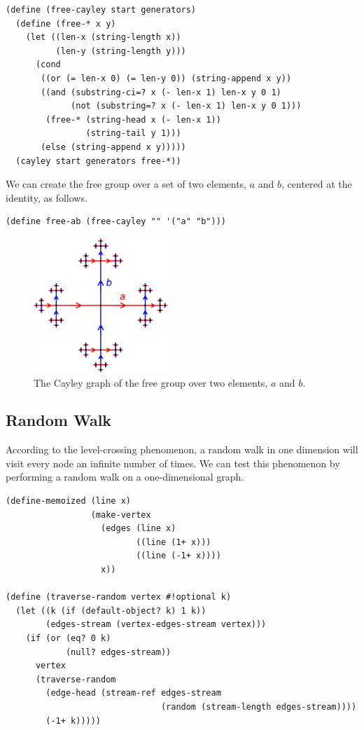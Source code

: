 \documentclass[11pt]{article} %
\theoremstyle{component}
\begin{document}
\begin{verbatim}
(define (free-cayley start generators)
  (define (free-* x y)
    (let ((len-x (string-length x))
          (len-y (string-length y)))
      (cond
       ((or (= len-x 0) (= len-y 0)) (string-append x y))
       ((and (substring-ci=? x (- len-x 1) len-x y 0 1)
             (not (substring=? x (- len-x 1) len-x y 0 1)))
        (free-* (string-head x (- len-x 1))
                (string-tail y 1)))
       (else (string-append x y)))))
  (cayley start generators free-*))
\end{verbatim}

\noindent We can create the free group over a set of two elements, $a$ and $b$, centered at the identity, as follows.

\begin{verbatim}
(define free-ab (free-cayley "" '("a" "b")))
\end{verbatim}


\begin{figure}
\centering
\includegraphics[height=2in]{cayley.png}
\caption{The Cayley graph of the free group over two elements, $a$ and $b$.}
\end{figure}

\subsection{Random Walk}

According to the level-crossing phenomenon, a random walk in one dimension will visit every node an infinite number of times.  We can test this phenomenon by performing a random walk on a one-dimensional graph.

\begin{verbatim}
(define-memoized (line x)
                 (make-vertex
                   (edges (line x)
                          ((line (1+ x)))
                          ((line (-1+ x))))
                   x))

(define (traverse-random vertex #!optional k)
  (let ((k (if (default-object? k) 1 k))
        (edges-stream (vertex-edges-stream vertex)))
    (if (or (eq? 0 k)
            (null? edges-stream))
      vertex
      (traverse-random
        (edge-head (stream-ref edges-stream
                               (random (stream-length edges-stream))))
        (-1+ k)))))
\end{verbatim}
\end{document}
